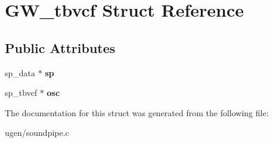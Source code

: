 \hypertarget{structGW__tbvcf}{}\section{G\+W\+\_\+tbvcf Struct Reference}
\label{structGW__tbvcf}
\subsection*{Public Attributes}
\begin{DoxyCompactItemize}
\item 
\hypertarget{structGW__tbvcf_a93ca699fa4af2f567a4d558336f5aa25}{}\label{structGW__tbvcf_a93ca699fa4af2f567a4d558336f5aa25} 
sp\+\_\+data $\ast$ {\bfseries sp}
\item 
\hypertarget{structGW__tbvcf_aef04b57e90938b9e07869f3a18234f14}{}\label{structGW__tbvcf_aef04b57e90938b9e07869f3a18234f14} 
sp\+\_\+tbvcf $\ast$ {\bfseries osc}
\end{DoxyCompactItemize}


The documentation for this struct was generated from the following file\+:\begin{DoxyCompactItemize}
\item 
ugen/soundpipe.\+c\end{DoxyCompactItemize}
